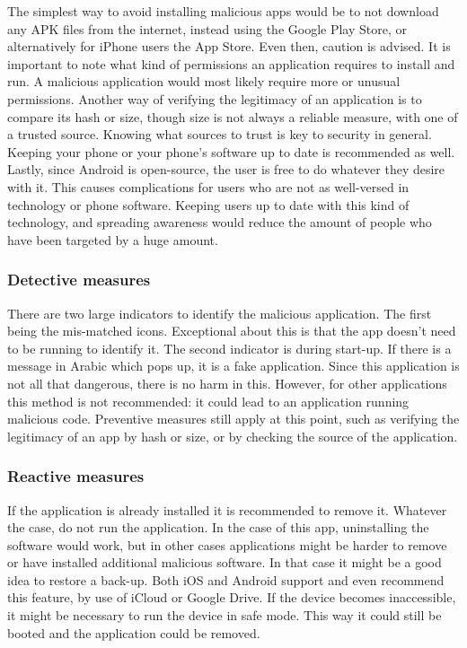 {{{{The simplest way to avoid installing malicious apps would be to not download any APK files from the internet, instead using the Google Play Store, or alternatively for iPhone users the App Store. Even then, caution is advised. It is important to note what kind of permissions an application requires to install and run. A malicious application would most likely require more or unusual permissions. Another way of verifying the legitimacy of an application is to compare its hash or size, though size is not always a reliable measure, with one of a trusted source. Knowing what sources to trust is key to security in general. Keeping your phone or your phone’s software up to date is recommended as well. Lastly, since Android is open-source, the user is free to do whatever they desire with it. This causes complications for users who are not as well-versed in technology or phone software. Keeping users up to date with this kind of technology, and spreading awareness would reduce the amount of people who have been targeted by a huge amount.

\subsubsection{Detective measures}

There are two large indicators to identify the malicious application. The first being the mis-matched icons. Exceptional about this is that the app doesn’t need to be running to identify it. The second indicator is during start-up. If there is a message in Arabic which pops up, it is a fake application. Since this application is not all that dangerous, there is no harm in this. However, for other applications this method is not recommended: it could lead to an application running malicious code. Preventive measures still apply at this point, such as verifying the legitimacy of an app by hash or size, or by checking the source of the application.
\subsubsection{Reactive measures}

If the application is already installed it is recommended to remove it. Whatever the case, do not run the application. In the case of this app, uninstalling the software would work, but in other cases applications might be harder to remove or have installed additional malicious software. In that case it might be a good idea to restore a back-up. Both iOS and Android support and even recommend this feature, by use of iCloud or Google Drive. If the device becomes inaccessible, it might be necessary to run the device in safe mode. This way it could still be booted and the application could be removed.
}}}}
